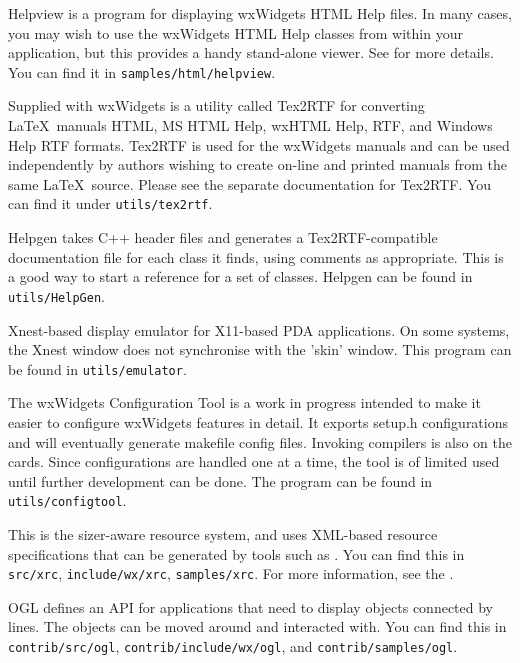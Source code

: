 \begin{description}\itemsep=0pt
\item[{\bf Helpview}]
Helpview is a program for displaying wxWidgets HTML
Help files. In many cases, you may wish to use the wxWidgets HTML
Help classes from within your application, but this provides a
handy stand-alone viewer. See  for more details.
You can find it in {\tt samples/html/helpview}.
\item[{\bf Tex2RTF}]
Supplied with wxWidgets is a utility called Tex2RTF for converting\rtfsp
\LaTeX\ manuals HTML, MS HTML Help, wxHTML Help, RTF, and Windows
Help RTF formats. Tex2RTF is used for the wxWidgets manuals and can be used independently
by authors wishing to create on-line and printed manuals from the same\rtfsp
\LaTeX\ source. Please see the separate documentation for Tex2RTF.
You can find it under {\tt utils/tex2rtf}.
\item[{\bf Helpgen}]
Helpgen takes C++ header files and generates a Tex2RTF-compatible
documentation file for each class it finds, using comments as appropriate.
This is a good way to start a reference for a set of classes.
Helpgen can be found in {\tt utils/HelpGen}.
\item[{\bf Emulator}]
Xnest-based display emulator for X11-based PDA applications. On some
systems, the Xnest window does not synchronise with the
'skin' window. This program can be found in {\tt utils/emulator}.
\item[{\bf Configuration Tool}]
The wxWidgets Configuration Tool is a work in progress
intended to make it easier to configure wxWidgets
features in detail. It exports setup.h configurations and will
eventually generate makefile config files. Invoking compilers is
also on the cards. Since configurations are
handled one at a time, the tool is of limited used until further
development can be done. The program can be found in {\tt utils/configtool}.
\item[{\bf XRC resource system}]
This is the sizer-aware resource system, and uses
XML-based resource specifications that can be generated by tools
such as .
You can find this in {\tt src/xrc}, {\tt include/wx/xrc}, {\tt samples/xrc}.
For more information, see the .
\item[{\bf Object Graphics Library}]
OGL defines an API for applications that need to display objects connected by lines.
The objects can be moved around and interacted with.
You can find this in {\tt contrib/src/ogl}, {\tt contrib/include/wx/ogl}, and {\tt contrib/samples/ogl}.

\end{description}
